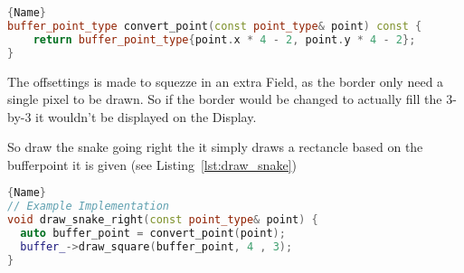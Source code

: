 \begin{lstlisting}[caption={Converting an Area's point to a Display's point},label={lst:convert_point},frame=tlrb, language=C++]{Name}
buffer_point_type convert_point(const point_type& point) const {
    return buffer_point_type{point.x * 4 - 2, point.y * 4 - 2};
}
\end{lstlisting}

The offsettings is made to squezze in an extra Field, as the border only need a single pixel to be drawn. So if the border would be changed to actually fill the 3-by-3 it wouldn't be displayed on the Display.

So draw the snake going right the it simply draws a rectancle based on the bufferpoint it is given (see Listing~\ref{lst:draw_snake})

\begin{lstlisting}[caption={Drawing a snake turning right},label={lst:draw_snake},frame=tlrb, language=C++]{Name}
// Example Implementation
void draw_snake_right(const point_type& point) {
  auto buffer_point = convert_point(point);
  buffer_->draw_square(buffer_point, 4 , 3);
}
\end{lstlisting}
